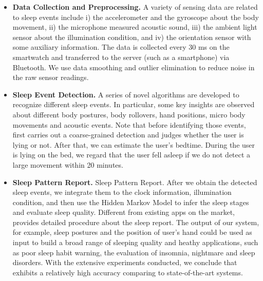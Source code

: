 \begin{itemize}[itemsep=1mm,nolistsep]
  \item {\textbf{Data Collection and Preprocessing.}} A variety of sensing data are related to sleep events include i) the accelerometer and the gyroscope about the body movement, ii) the microphone measured acoustic sound, iii) the ambient light sensor about the illumination condition, and iv) the orientation sensor with some auxiliary information. The data is collected every 30 ms on the smartwatch and transferred to the server (such as a smartphone) via Bluetooth. We use data smoothing and outlier elimination to reduce noise in the raw sensor readings.
  \item \textbf{Sleep Event Detection.} A series of novel algorithms are developed to recognize different sleep events. In particular, some key insights are observed about different body postures, body rollovers, hand positions, micro body movements and acoustic events. Note that before identifying those events, {\systemname} first carries out a coarse-grained detection and judges whether the user is lying or not.  After that, we can estimate the user's bedtime. During the user is lying on the bed,  we regard that the user fell asleep if we do not detect a large movement within 20 minutes.
  \item \textbf{{Sleep Pattern Report.}} Sleep Pattern Report. After we obtain the detected sleep events, we integrate them to the clock information, illumination condition, and then use the Hidden Markov Model to infer the sleep stages and evaluate sleep quality. Different from existing apps on the market, {\systemname} provides detailed procedure about the sleep report. The output of our system, for example, sleep postures and the position of user's hand could be used as input to build a broad range of sleeping quality and  heathy applications, such as poor sleep habit warning, the evaluation of insomnia, nightmare and sleep disorders. With the extensive experiments conducted, we conclude that {\systemname} exhibits a relatively high accuracy comparing to state-of-the-art systems.
\end{itemize}


